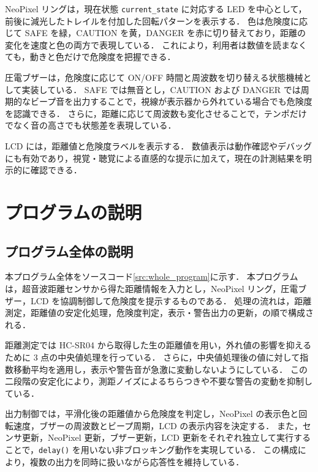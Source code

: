 \documentclass[a4paper,fontsize=11pt,line_length=40zw,number_of_lines=35,baselineskip=1.7zw]{jlreq}
\begin{document}
NeoPixel リングは，現在状態 \lstinline|current_state| に対応する LED を中心として，前後に減光したトレイルを付加した回転パターンを表示する．
色は危険度に応じて SAFE を緑，CAUTION を黄，DANGER を赤に切り替えており，距離の変化を速度と色の両方で表現している．
これにより，利用者は数値を読まなくても，動きと色だけで危険度を把握できる．

圧電ブザーは，危険度に応じて ON/OFF 時間と周波数を切り替える状態機械として実装している．
SAFE では無音とし，CAUTION および DANGER では周期的なビープ音を出力することで，視線が表示器から外れている場合でも危険度を認識できる\cite{arduinodocumentationteam2025Tone, arduinodocumentationteam2025NoTone}．
さらに，距離に応じて周波数も変化させることで，テンポだけでなく音の高さでも状態差を表現している．

LCD には，距離値と危険度ラベルを表示する．
数値表示は動作確認やデバッグにも有効であり，視覚・聴覚による直感的な提示に加えて，現在の計測結果を明示的に確認できる．

\section{プログラムの説明}
\subsection{プログラム全体の説明}
本プログラム全体をソースコード\ref{src:whole_program}に示す．
本プログラムは，超音波距離センサから得た距離情報を入力とし，NeoPixel リング，圧電ブザー，LCD を協調制御して危険度を提示するものである．
処理の流れは，距離測定，距離値の安定化処理，危険度判定，表示・警告出力の更新，の順で構成される．

距離測定では HC-SR04 から取得した生の距離値を用い，外れ値の影響を抑えるために 3 点の中央値処理を行っている．
さらに，中央値処理後の値に対して指数移動平均を適用し，表示や警告音が急激に変動しないようにしている．
この二段階の安定化により，測距ノイズによるちらつきや不要な警告の変動を抑制している．

出力制御では，平滑化後の距離値から危険度を判定し，NeoPixel の表示色と回転速度，ブザーの周波数とビープ周期，LCD の表示内容を決定する．
また，センサ更新，NeoPixel 更新，ブザー更新，LCD 更新をそれぞれ独立して実行することで，\lstinline|delay()| を用いない非ブロッキング動作を実現している．
この構成により，複数の出力を同時に扱いながら応答性を維持している．
\end{document}
